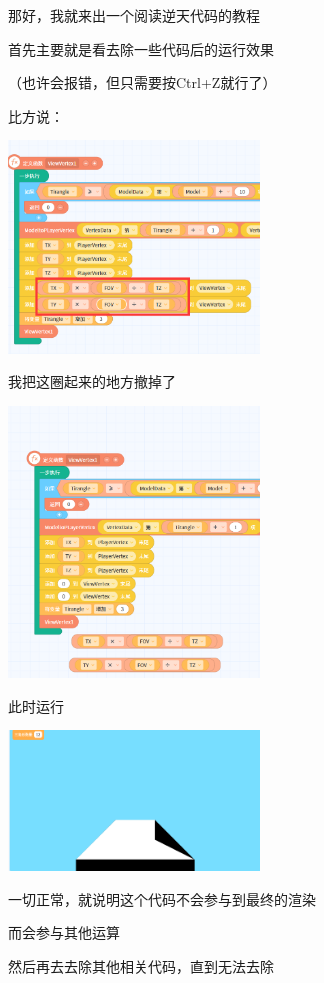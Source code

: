 \documentclass[UTF8,fontset=fandol]{article}
\begin{document}
	那好，我就来出一个阅读逆天代码的教程
	
	首先主要就是看去除一些代码后的运行效果
	
	（也许会报错，但只需要按Ctrl+Z就行了）
	
	比方说：
	
	\includegraphics[width=0.5\textwidth]{assets/01/fire-1.png}
	
	我把这圈起来的地方撤掉了
	
	\includegraphics[width=0.5\textwidth]{assets/01/fire-2.png}
	
	此时运行
	
	\includegraphics[width=0.5\textwidth]{assets/01/fire-3.png}
	
	一切正常，就说明这个代码不会参与到最终的渲染
	
	而会参与其他运算
	
	然后再去去除其他相关代码，直到无法去除
	
\end{document}

